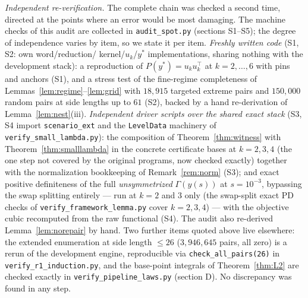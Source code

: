 \documentclass[11pt]{article}
\begin{document}
\emph{Independent re-verification.} The complete chain was checked a
second time, directed at the points where an error would be most damaging.
The machine checks of this audit are collected in \texttt{audit\_spot.py}
(sections S1--S5); the degree of independence varies by item, so we state
it per item. \emph{Freshly written code} (S1, S2: own word/reduction/%
kernel/$u_k$/$y^\ast$ implementations, sharing nothing with the
development stack): a reproduction of $P(y^\ast)=u_ku_k^\top$ at
$k=2,\dots,6$ with pins and anchors (S1), and a stress test of the
fine-regime completeness of Lemmas~\ref{lem:regime}--\ref{lem:grid} with
$18{,}915$ targeted extreme pairs and $150{,}000$ random pairs at side
lengths up to $61$ (S2), backed by a hand re-derivation of
Lemma~\ref{lem:nest}(iii). \emph{Independent driver scripts over the
shared exact stack} (S3, S4 import \texttt{scenario\_ext} and the
\texttt{LevelData} machinery of \texttt{verify\_small\_lambda.py}): the
composition of Theorem~\ref{thm:witness} with
Theorem~\ref{thm:smalllambda} in the concrete certificate bases at
$k=2,3,4$ (the one step not covered by the original programs, now checked
exactly) together with the normalization bookkeeping of
Remark~\ref{rem:norm} (S3); and exact positive definiteness of the full
\emph{unsymmetrized} $\Gamma(y(s))$ at $s=10^{-3}$, bypassing the swap
splitting entirely --- run at $k=2$ and $3$ only (the swap-split exact PD
checks of \texttt{verify\_framework\_lemma.py} cover $k=2,3,4$) --- with
the objective cubic recomputed from the raw functional (S4). The audit
also re-derived Lemma~\ref{lem:norepair} by hand. Two further items
quoted above live elsewhere: the extended enumeration at side length
$\le26$ ($3{,}946{,}645$ pairs, all zero) is a rerun of the development
engine, reproducible via \texttt{check\_all\_pairs(26)} in
\texttt{verify\_r1\_induction.py}, and the base-point integrals of
Theorem~\ref{thm:L2} are checked exactly in
\texttt{verify\_pipeline\_laws.py} (section D). No discrepancy was found
in any step.
\end{document}

